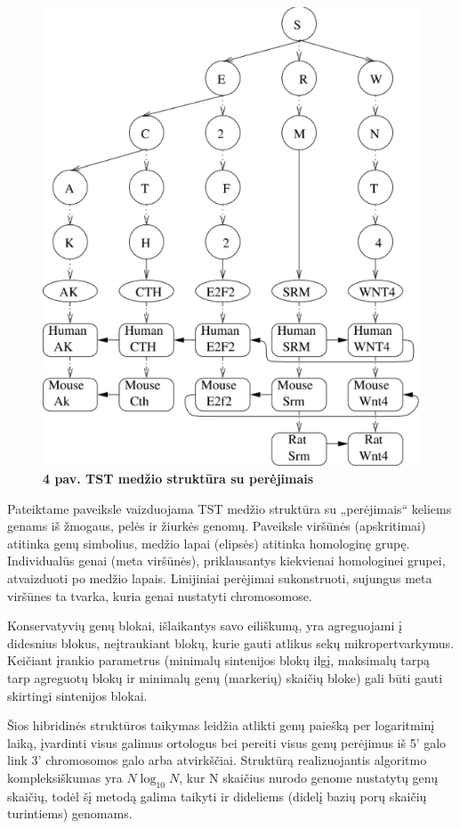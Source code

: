 \documentclass[12pt]{article}
\begin{document}
\begin{figure}[htb]
    \begin{center}
        \includegraphics[width=0.5\linewidth]{../Figures/TTS_data_structure.png}
        \vspace{-0.5\baselineskip}
        \caption*{\small\textbf{4 pav. TST medžio struktūra su perėjimais}}
        \label{fig:birds}
    \end{center}
\end{figure}

Pateiktame paveiksle vaizduojama TST medžio struktūra su „perėjimais“ keliems
genams iš žmogaus, pelės ir žiurkės genomų. Paveiksle viršūnės (apskritimai)
atitinka genų simbolius, medžio lapai (elipsės) atitinka homologinę grupę.
Individualūs genai (meta viršūnės), priklausantys kiekvienai homologinei
grupei, atvaizduoti po medžio lapais. Linijiniai perėjimai sukonstruoti,
sujungus meta viršūnes ta tvarka, kuria genai nustatyti chromosomose.

Konservatyvių genų blokai, išlaikantys savo eiliškumą, yra agreguojami į
didesnius blokus, neįtraukiant blokų, kurie gauti atlikus sekų
mikropertvarkymus. Keičiant įrankio parametrus (minimalų sintenijos blokų
ilgį, maksimalų tarpą tarp agreguotų blokų ir minimalų genų (markerių) skaičių
bloke) gali būti gauti skirtingi sintenijos blokai.


Šios hibridinės struktūros taikymas leidžia atlikti genų paiešką per logaritminį
laiką, įvardinti visus galimus ortologus bei pereiti visus genų perėjimus iš 5'
galo link 3' chromosomos galo arba atvirkščiai. Struktūrą realizuojantis
algoritmo kompleksiškumas yra $ N\log_{10}N $, kur N skaičius nurodo genome
nustatytų genų skaičių, todėl šį metodą galima taikyti ir dideliems (didelį
bazių porų skaičių turintiems) genomams.
\end{document}
